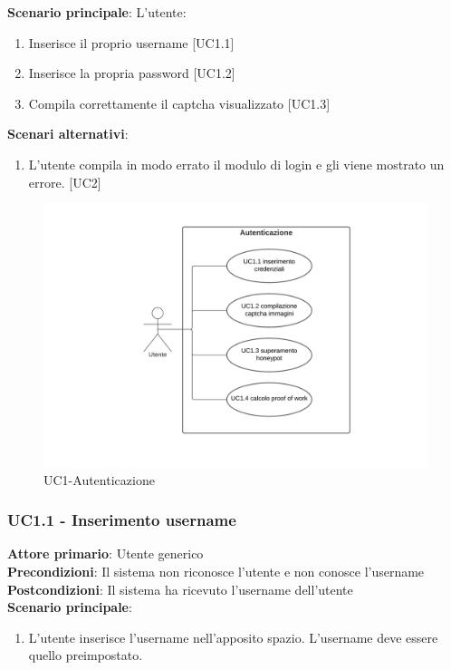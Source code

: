 \textbf{Scenario principale}: L'utente:
\begin{enumerate}
\item Inserisce il proprio username [UC1.1]
\item Inserisce la propria password [UC1.2]
\item Compila correttamente il captcha visualizzato [UC1.3]
\end{enumerate}

\textbf{Scenari alternativi}:
\begin{enumerate}
    \item L’utente compila in modo errato il modulo di login e gli viene mostrato un errore. [UC2]
\end{enumerate}

\begin{figure}[H]
    \centering
    \includegraphics[scale=0.8]{img/Autenticazione.png}
    \caption{UC1-Autenticazione}
\end{figure}

\subsubsection{UC1.1 - Inserimento username}
\textbf{Attore primario}: Utente generico\\
\textbf{Precondizioni}: Il sistema non riconosce l'utente e non conosce l'username\\
\textbf{Postcondizioni}: Il sistema ha ricevuto l'username dell'utente\\

\textbf{Scenario principale}:
\begin{enumerate}
   \item L'utente inserisce l'username nell'apposito spazio. L'username deve essere quello preimpostato.
\end{enumerate}

